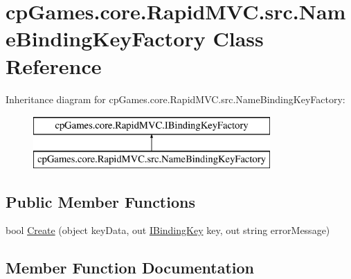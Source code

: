 \hypertarget{classcp_games_1_1core_1_1_rapid_m_v_c_1_1src_1_1_name_binding_key_factory}{}\section{cp\+Games.\+core.\+Rapid\+M\+V\+C.\+src.\+Name\+Binding\+Key\+Factory Class Reference}
\label{classcp_games_1_1core_1_1_rapid_m_v_c_1_1src_1_1_name_binding_key_factory}
Inheritance diagram for cp\+Games.\+core.\+Rapid\+M\+V\+C.\+src.\+Name\+Binding\+Key\+Factory\+:\begin{figure}[H]
\begin{center}
\leavevmode
\includegraphics[height=2.000000cm]{classcp_games_1_1core_1_1_rapid_m_v_c_1_1src_1_1_name_binding_key_factory}
\end{center}
\end{figure}
\subsection*{Public Member Functions}
\begin{DoxyCompactItemize}
\item 
bool \mbox{\hyperlink{classcp_games_1_1core_1_1_rapid_m_v_c_1_1src_1_1_name_binding_key_factory_a12bc08a62a5c91a8e1b8c8f6ed280cb6}{Create}} (object key\+Data, out \mbox{\hyperlink{interfacecp_games_1_1core_1_1_rapid_m_v_c_1_1_i_binding_key}{I\+Binding\+Key}} key, out string error\+Message)
\end{DoxyCompactItemize}


\subsection{Member Function Documentation}
\mbox{\label{classcp_games_1_1core_1_1_rapid_m_v_c_1_1src_1_1_name_binding_key_factory_a12bc08a62a5c91a8e1b8c8f6ed280cb6}} 
